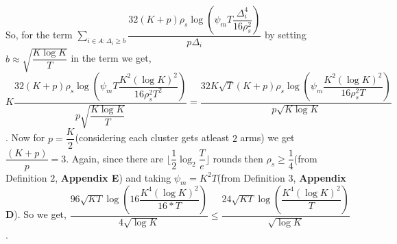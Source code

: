 \begin{remark}
So, for the term $\sum_{i\in A:\Delta_{i}\geq b}\dfrac{32(K+p)\rho_{s}\log{(\psi_{m}T\dfrac{\Delta_{i}^{4}}{16\rho_{s}^{2}})}}{p\Delta_{i}}$ by setting $b\approx \sqrt{\dfrac{K\log K}{T}}$ in the term we get, $K\dfrac{32(K+p)\rho_{s}\log{(\psi_{m}T\dfrac{K^{2}(\log K)^{2}}{16\rho_{s}^{2}T^{2}})}}{p \sqrt{\dfrac{K\log K}{T}}}=\dfrac{32K\sqrt{T}(K+p)\rho_{s}\log{(\psi_{m}\dfrac{K^{2}(\log K)^{2}}{16\rho_{s}^{2}T})}}{p \sqrt{K\log K}}$. Now for $p= \dfrac{K}{2}$(considering each cluster gets atleast $2$ arms) we get $\dfrac{(K+p)}{p}=  3$. Again, since there are $\big \lfloor \dfrac{1}{2}\log_{2} \dfrac{T}{e}\big\rfloor$ rounds then $\rho_{s}\geq \dfrac{1}{4}$(from Definition $2$, \textbf{Appendix E}) and taking $\psi_{m}=K^{2}T$(from Definition $3$, \textbf{Appendix D}). So we get, $\dfrac{96\sqrt{KT}\log{(16\dfrac{K^{4}(\log K)^{2}}{16*T})}}{4\sqrt{\log K}} \leq \dfrac{24\sqrt{KT}\log{(\dfrac{K^{4}(\log K)^{2}}{T})}}{\sqrt{\log K}}$.
\end{remark}



